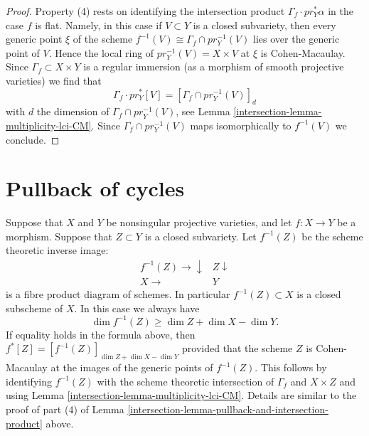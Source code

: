 \begin{proof}
\medskip\noindent
Property (4) rests on identifying the intersection product
$\Gamma_f \cdot pr_Y^*\alpha$ in the case $f$ is flat. Namely, in this
case if $V \subset Y$ is a closed subvariety, then every generic point
$\xi$ of the scheme $f^{-1}(V) \cong \Gamma_f \cap pr_Y^{-1}(V)$
lies over the generic point of $V$. Hence the local ring of
$pr_Y^{-1}(V) = X \times V$ at $\xi$ is Cohen-Macaulay. Since
$\Gamma_f \subset X \times Y$ is a regular immersion (as a morphism of
smooth projective varieties) we find that
$$
\Gamma_f \cdot pr_Y^*[V] = [\Gamma_f \cap pr_Y^{-1}(V)]_d
$$
with $d$ the dimension of $\Gamma_f \cap pr_Y^{-1}(V)$, see
Lemma \ref{intersection-lemma-multiplicity-lci-CM}. Since $\Gamma_f \cap pr_Y^{-1}(V)$
maps isomorphically to $f^{-1}(V)$ we conclude.
\end{proof}

\section{Pullback of cycles}
\label{intersection-section-pullback-cycles}
Suppose that $X$ and $Y$ be nonsingular
projective varieties, and let $f : X \to Y$ be a morphism.
Suppose that $Z \subset Y$ is a closed subvariety. Let $f^{-1}(Z)$
be the scheme theoretic inverse image:
$$
\begin{array}{cc}f^{-1}(Z) \longrightarrow\downarrow & Z \downarrow \\ X \longrightarrow & Y\end{array}
$$
is a fibre product diagram of schemes. In particular $f^{-1}(Z) \subset X$
is a closed subscheme of $X$. In this case we always have
$$
\dim f^{-1}(Z) \geq \dim Z + \dim X - \dim Y.
$$
If equality holds in the formula above, then
$f^*[Z] = [f^{-1}(Z)]_{\dim Z + \dim X - \dim Y}$
provided that the scheme $Z$ is Cohen-Macaulay at the images
of the generic points of $f^{-1}(Z)$. This follows by identifying
$f^{-1}(Z)$ with the scheme theoretic intersection of $\Gamma_f$
and $X \times Z$ and using Lemma \ref{intersection-lemma-multiplicity-lci-CM}.
Details are similar to the proof of part (4) of
Lemma \ref{intersection-lemma-pullback-and-intersection-product} above.



